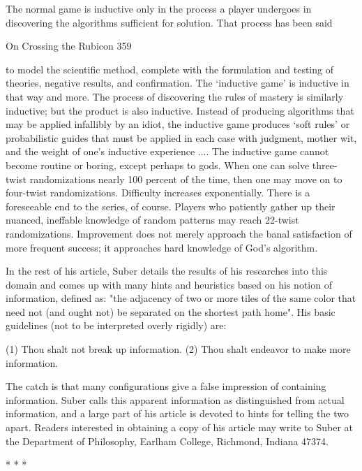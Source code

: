        The normal game is inductive only in the process a player undergoes in
discovering the algorithms sufficient for solution. That process has been said




On Crossing the Rubicon                                                             359

to model the scientific method, complete with the formulation and testing of
theories, negative results, and confirmation. The `inductive game' is inductive in
that way and more. The process of discovering the rules of mastery is similarly
inductive; but the product is also inductive. Instead of producing algorithms that
may be applied infallibly by an idiot, the inductive game produces `soft rules' or
probabilistic guides that must be applied in each case with judgment, mother wit,
and the weight of one's inductive experience ....
        The inductive game cannot become routine or boring, except perhaps to
gods. When one can solve three-twist randomizations nearly 100 percent of the
time, then one may move on to four-twist randomizations. Difficulty increases
exponentially. There is a foreseeable end to the series, of course. Players who
patiently gather up their nuanced, ineffable knowledge of random patterns may
reach 22-twist randomizations. Improvement does not merely approach the banal
satisfaction of more frequent success; it approaches hard knowledge of God's
algorithm.

       In the rest of his article, Suber details the results of his researches into this
domain and comes up with many hints and heuristics based on his notion of
information, defined as: "the adjacency of two or more tiles of the same color that
need not (and ought not) be separated on the shortest path home". His basic
guidelines (not to be interpreted overly rigidly) are:

       (1) Thou shalt not break up information.
       (2) Thou shalt endeavor to make more information.

        The catch is that many configurations give a false impression of containing
information. Suber calls this apparent information as distinguished from actual
information, and a large part of his article is devoted to hints for telling the two
apart. Readers interested in obtaining a copy of his article may write to Suber at the
Department of Philosophy, Earlham College, Richmond, Indiana 47374.

                                       *   *   *

